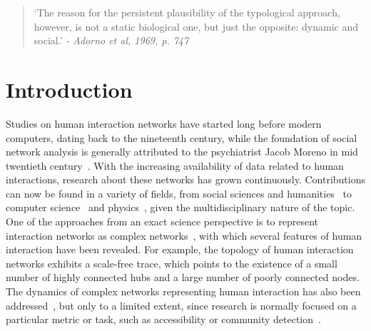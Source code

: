 \documentclass[%
	aip,
	jmp,%
	amsmath,amssymb,
	reprint,%
]{revtex4-1}
\begin{document}
\begin{quotation}
	`The reason for the persistent plausibility of the typological approach, however, is not a static biological one, but just the opposite: dynamic and social.' 
	\emph{- Adorno et al, 1969, p. 747}
\end{quotation}


\section{Introduction}\label{sec:into}
Studies on human interaction networks have started long before modern computers, dating back to the nineteenth century, while the foundation of
social network analysis is generally attributed to the psychiatrist Jacob Moreno in mid twentieth century~\cite{moreno,newmanBook}. With the increasing availability of data related to human interactions, research about these networks has grown continuously. Contributions can now be found in a variety of fields, from social sciences and humanities~\cite{latour2013} to computer science~\cite{bird} and physics~\cite{barabasiHumanDyn,newmanFriendship}, given the multidisciplinary nature of the topic. One of the approaches from an exact science perspective is to represent interaction networks as complex networks~\cite{barabasiHumanDyn,newmanFriendship}, with which 
several features of human interaction have been revealed. For example, the topology of human interaction networks exhibits a scale-free trace, which points to the existence of a small number of highly connected hubs and a large number of poorly connected nodes. The dynamics of complex networks representing human interaction has also been addressed~\cite{barabasiEvo,newmanEvolving}, but only to a limited extent, since research is normally focused on a particular metric or task, such as accessibility or community detection~\cite{access,newmanModularity}. 
\end{document}

